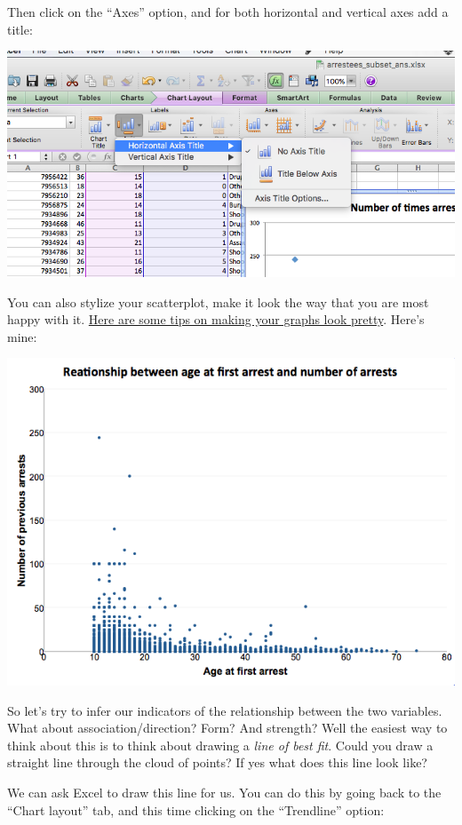\documentclass[
]{book}
\begin{document}
Then click on the ``Axes'' option, and for both horizontal and vertical axes add a title:

\includegraphics{imgs/scatter_8.png}

You can also stylize your scatterplot, make it look the way that you are most happy with it. \href{http://strategyandanalytics.com/5-steps-creating-beautiful-eye-catching-charts-excel/}{Here are some tips on making your graphs look pretty}. Here's mine:

\includegraphics{imgs/scatter_9.png}

So let's try to infer our indicators of the relationship between the two variables. What about association/direction? Form? And strength? Well the easiest way to think about this is to think about drawing a \emph{line of best fit}. Could you draw a straight line through the cloud of points? If yes what does this line look like?

We can ask Excel to draw this line for us. You can do this by going back to the ``Chart layout'' tab, and this time clicking on the ``Trendline'' option:
\end{document}
